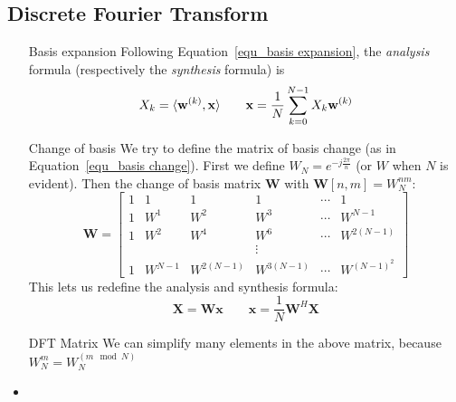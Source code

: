 \documentclass[11pt,a4paper]{article}
\begin{document}
\subsection{Discrete Fourier Transform}
\begin{itemize}
    \item[Basis expansion]Following Equation~\ref{equ_basis expansion}, the \textit{analysis} formula (respectively the \textit{synthesis} formula) is
        \begin{equation}
            X_k = \langle\mathbf{w}^{(k)},\mathbf{x}\rangle \qquad \mathbf{x} = \frac{1}{N} \somme{N-1}{k=0}X_k \mathbf{w}^{(k)}
        \end{equation}
    \item[Change of basis]We try to define the matrix of basis change (as in Equation~\ref{equ_basis change}). First we define $W_N = e^{-j\frac{2\pi}{n}}$ (or $W$ when $N$ is evident). Then the change of basis matrix $\mathbf{W}$ with $\mathbf{W}[n,m] = W_N^{nm}$: 
        \begin{equation}
            \mathbf{W} = 
            \begin{bmatrix}
                1 & 1 & 1 & 1 & \cdots & 1
                \\1 & W^1 & W^2 & W^3 & \cdots & W^{N-1}
                \\1 & W^2 & W^4 & W^6 & \cdots & W^{2(N-1)}
                \\& & & \vdots
                \\1 & W^{N-1} & W^{2(N-1)} & W^{3(N-1)} & \cdots & W^{(N-1)^2}
            \end{bmatrix}
        \end{equation}
        This lets us redefine the analysis and synthesis formula:
        \begin{equation}
            \mathbf{X} = \mathbf{W}\mathbf{x} \qquad \mathbf{x} =\frac{1}{N}\mathbf{W}^H \mathbf{X}
        \end{equation}
    \item[DFT Matrix]We can simplify many elements in the above matrix, because $W_N^m = W_N^{(m \mod N)}$
    \item 
\end{itemize}
\end{document}
